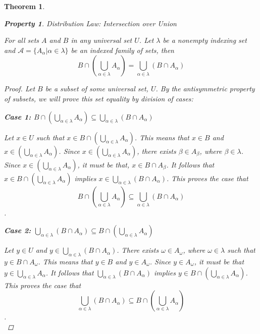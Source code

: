 \documentclass{book}
\newtheorem{theorem}{Theorem}[section]
\newtheorem{property}{Property}[theorem]
\theoremstyle{definition}
\theoremstyle{remark}
\newcommand{\cc}[1]{\mathcal{#1}}
\begin{document}
\begin{theorem}
    
    
    \newpage
    \begin{property}
    Distribution Law: Intersection over Union \\
        \begin{tcolorbox}
            For all sets $A$ and $B$ in any universal set $U$. Let $\lambda$ be a nonempty indexing set and $\cc{A} = \{ A_{\alpha} | \alpha \in \lambda \}$ be an indexed family of sets, then
                \begin{equation*}
                    B \cap \left ( \bigcup_{\alpha \in \lambda}{A_{\alpha}} \right ) = \bigcup_{\alpha \in \lambda}{(B \cap A_{\alpha})}
                \end{equation*}
        \end{tcolorbox}
    
        \begin{proof}
            Let $B$ be a subset of some universal set, $U$. By the antisymmetric property of subsets, we will prove this set equality by division of cases: \\
            
            \begin{flushleft} \textbf{Case 1: $B \cap \left ( \bigcup_{\alpha \in \lambda}{A_{\alpha}} \right ) \subseteq \bigcup_{\alpha \in \lambda}{(B \cap A_{\alpha})}$} \end{flushleft}
                Let $x \in U$ such that $x \in B \cap \left ( \bigcup_{\alpha \in \lambda}{A_{\alpha}} \right )$. This means that $x \in B$ and $x \in \left ( \bigcup_{\alpha \in \lambda}{A_{\alpha}} \right )$. Since $x \in \left ( \bigcup_{\alpha \in \lambda}{A_{\alpha}} \right )$, there exists $\beta \in A_{\beta}$, where $\beta \in \lambda$. Since $x \in \left ( \bigcup_{\alpha \in \lambda}{A_{\alpha}} \right )$, it must be that, $x \in B \cap A_{\beta}$. It follows that $x \in B \cap \left ( \bigcup_{\alpha \in \lambda}{A_{\alpha}} \right )$ implies $x \in \bigcup_{\alpha \in \lambda}{(B \cap A_{\alpha})}$. This proves the case that $$B \cap \left ( \bigcup_{\alpha \in \lambda}{A_{\alpha}} \right ) \subseteq \bigcup_{\alpha \in \lambda}{(B \cap A_{\alpha})}$$. \\
                
            \begin{flushleft} \textbf{Case 2: $\bigcup_{\alpha \in \lambda}{(B \cap A_{\alpha})} \subseteq B \cap \left ( \bigcup_{\alpha \in \lambda}{A_{\alpha}} \right )$} \end{flushleft} 
                Let $y \in U$ and $y \in \bigcup_{\alpha \in \lambda}{(B \cap A_{\alpha})}$. There exists $\omega \in A_{\omega}$, where $\omega \in \lambda$ such that $y \in B \cap A_{\omega}$. This means that $y \in B$ and $y \in A_{\omega}$. Since $y \in A_{\omega}$, it must be that $y \in \bigcup_{\alpha \in \lambda}{A_{\alpha}}$. It follows that $\bigcup_{\alpha \in \lambda}{(B \cap A_{\alpha})}$ implies $y \in B \cap \left ( \bigcup_{\alpha \in \lambda}{A_{\alpha}} \right )$. This proves the case that $$\bigcup_{\alpha \in \lambda}{(B \cap A_{\alpha})} \subseteq B \cap \left ( \bigcup_{\alpha \in \lambda}{A_{\alpha}} \right )$$. \\
                

\end{proof}
\end{property}
\end{theorem}
\end{document}
